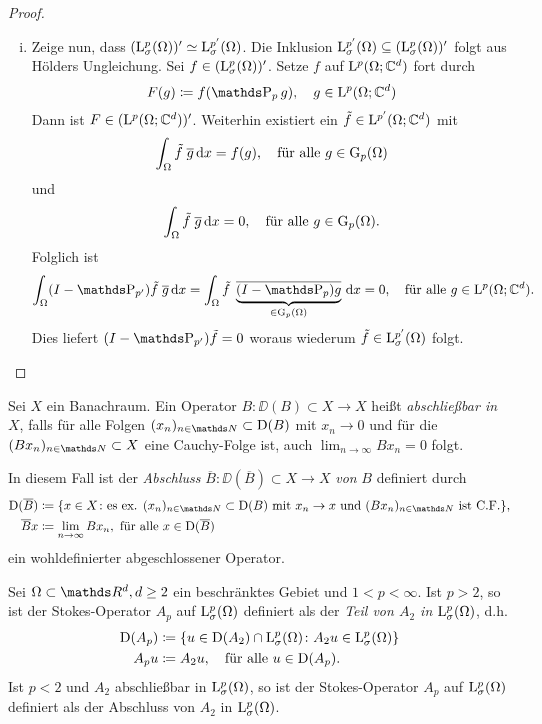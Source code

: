 \begin{proof}
\begin{enumerate}[(i)]
\item Zeige nun, dass $(\mathrm{L}_\sigma^{p}(\Omega))' \simeq \mathrm{L}^{p'}_\sigma(\Omega)$.
  Die Inklusion $\mathrm{L}_\sigma^{p'}(\Omega) \subseteq (\mathrm{L}_\sigma^p(\Omega))'$ folgt aus Hölders Ungleichung.
  Sei $f \in (\mathrm{L}_\sigma^p(\Omega))'$.
  Setze $f$ auf $\mathrm{L}^p(\Omega; \mathbb{C}^d)$ fort durch
  $$
  F(g) \coloneqq f(\PP_p g), \quad g \in \Ell^p(\Omega; \C^d)
  $$
  Dann ist $F \in (\mathrm{L}^p(\Omega; \mathbb{C}^d))'$. Weiterhin existiert ein $\tilde f \in \mathrm{L}^{p'}(\Omega; \mathbb{C}^d)$ mit 
  $$
  \int_\Omega \tilde f \; \overline g \, {\operatorname{d}\!{x}} = f(g), \quad\text{für alle } g \in \mathrm{G}_p(\Omega)
  $$
  und
  $$
  \int_\Omega \tilde f \; \overline g \, {\operatorname{d}\!{x}} = 0, \quad\text{für alle } g \in \mathrm{G}_p(\Omega).
  $$
  Folglich ist
  $$
  \int_\Omega (I - \PP_{p'} ) \tilde f \; \overline g \d x 
  = \int_\Omega \tilde f \; \underbrace{\overline{(I - \PP_p)g}}_{\in \GG_p(\Omega)} \d x
  = 0, \quad\text{für alle } g \in \Ell^p(\Omega; \C^d).
  $$
  Dies liefert $(I - \PP_{p'}) \tilde f = 0$ woraus wiederum $\tilde f \in \mathrm{L}_\sigma^{p'}(\Omega)$ folgt.
  \end{enumerate}
\end{proof}

\begin{defn}
  Sei $X$ ein Banachraum.
  Ein Operator $B \colon \DD(B) \subset X \to X$ heißt \emph{abschließbar in } $X$, falls für alle Folgen $(x_n)_{n \in \N} \subset \DD(B)$ mit $x_n \to 0$ und für die $(B x_n)_{n \in \N} \subset X$ eine Cauchy-Folge ist, auch $\lim_{n \to \infty} B x_n = 0$ folgt.

  In diesem Fall ist der \emph{Abschluss} $\overline B \colon \DD(\overline B) \subset X \to X$ \emph{von} $B$ definiert durch
  \begin{align*}
  \DD(\overline B) &\coloneqq \{ x \in X \colon \text{es ex. } (x_n)_{n \in \N} \subset \DD(B) \text{ mit } x_n \to x \text{ und } (B x_n)_{n \in \N} \text{ ist C.F.} \}, \\
  \overline B x &\coloneqq \lim_{n \to \infty} B x_n, \text{ für alle } x \in \DD(\overline B)
\end{align*}
ein wohldefinierter abgeschlossener Operator.
\end{defn}

\begin{defn}
  Sei $\Omega \subset \R^d, d \geq 2$ ein beschränktes Gebiet und $1 < p < \infty$.
  Ist $p > 2$, so ist der Stokes-Operator $A_p$ auf $\mathrm{L}_\sigma^p(\Omega)$ definiert als der \emph{Teil von $A_2$ in $\mathrm{L}^p_\sigma(\Omega)$}, d.h.
  \begin{align*}
    \mathrm{D}(A_p) &\coloneqq \{ u \in \mathrm{D}(A_2) \cap \mathrm{L}_\sigma^p(\Omega) \colon A_2 u \in \mathrm{L}_\sigma^p(\Omega) \} \\
    A_p u &\coloneqq A_2 u, \quad\text{für alle } u \in \mathrm{D}(A_p).
  \end{align*}
  Ist $p < 2$ und $A_2$ abschließbar in $\mathrm{L}_\sigma^p(\Omega)$, so ist der Stokes-Operator $A_p$ auf $\mathrm{L}_\sigma^p(\Omega)$ definiert als der Abschluss von $A_2$ in $\mathrm{L}_\sigma^p(\Omega)$.
\end{defn}

